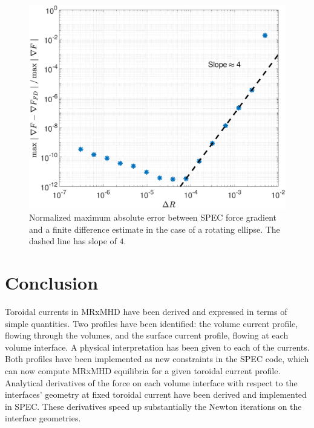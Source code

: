  \begin{figure}
     \centering
     \includegraphics[width=.5\linewidth]{main/Figures_CurrentConstraint/ABaillod_fig10.pdf}
     \caption{Normalized maximum absolute error between \ac{SPEC} force gradient and a finite difference estimate in the case of a rotating ellipse. The dashed line has slope of $4$.} \label{fig:conv_FG_rotell}
 \end{figure}
 
 
 
 
 \section{Conclusion} \label{sec.discussion}
 
 Toroidal currents in \ac{MRxMHD} have been derived and expressed in terms of simple quantities. Two profiles have been identified: the volume current profile, flowing through the volumes, and the surface current profile, flowing at each volume interface. A physical interpretation has been given to each of the currents. Both profiles have been implemented as new constraints in the \ac{SPEC} code, which can now compute \ac{MRxMHD} equilibria for a given toroidal current profile. Analytical derivatives of the force on each volume interface with respect to the interfaces' geometry at fixed toroidal current have been derived and implemented in \ac{SPEC}. These derivatives speed up substantially the Newton iterations on the interface geometries.
 
